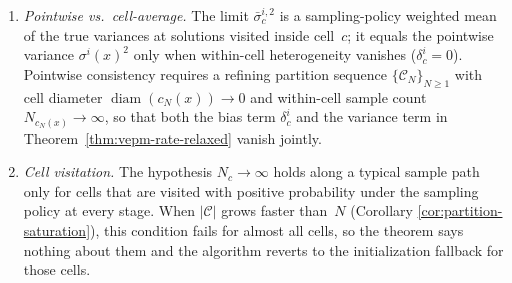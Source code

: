 \begin{enumerate}
  \item \emph{Pointwise vs.\ cell-average.}  The limit
  $\bar{\sigma}_{c}^{i,2}$ is a sampling-policy weighted mean of the
  true variances at solutions visited inside cell~$c$; it equals the
  pointwise variance $\sigma^{i}(x)^{2}$ only when within-cell
  heterogeneity vanishes ($\delta_{c}^{i}=0$).  Pointwise consistency
  requires a refining partition sequence
  $\{\mathcal{C}_{N}\}_{N\ge 1}$ with cell diameter
  $\operatorname{diam}(c_{N}(x))\to 0$ and within-cell sample count
  $N_{c_{N}(x)}\to\infty$, so that both the bias term
  $\delta_{c}^{i}$ and the variance term in
  Theorem~\ref{thm:vepm-rate-relaxed} vanish jointly.

  \item \emph{Cell visitation.}  The hypothesis $N_{c}\to\infty$ holds
  along a typical sample path only for cells that are visited with
  positive probability under the sampling policy at every stage.  When
  $|\mathcal{C}|$ grows faster than~$N$ (Corollary
  \ref{cor:partition-saturation}), this condition fails for almost all
  cells, so the theorem says nothing about them and the algorithm
  reverts to the initialization fallback for those cells.
\end{enumerate}


